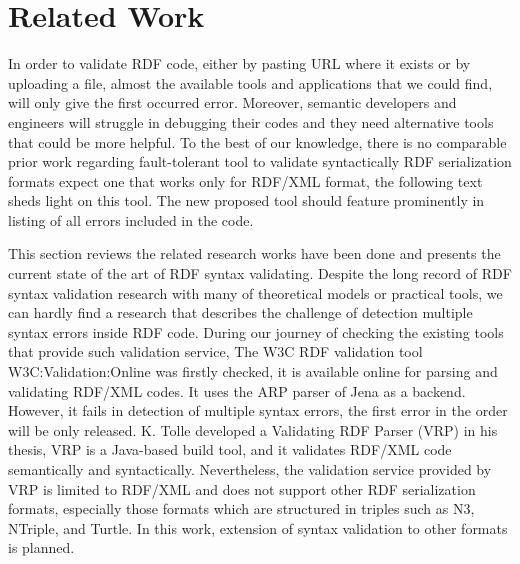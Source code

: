 \chapter{Related Work}
\label{ch:related}
\newpage


In order to validate RDF code, either by pasting URL where it exists or by uploading a file, almost the available tools and applications that we could find, will only give the first occurred error. Moreover, semantic developers and engineers will struggle in debugging their codes and they need alternative tools that could be more helpful. To the best of our knowledge, there is no comparable prior work regarding fault-tolerant tool to validate syntactically RDF serialization formats expect one that works only for RDF/XML format, the following text sheds light on this tool. The new proposed tool should feature prominently in listing of all errors included in the code.
	\vspace{5mm} %
\par This section reviews the related research works have been done and presents the current state of the art of RDF syntax validating. Despite the long record of RDF syntax validation research with many of theoretical models or practical tools, we can hardly find a research that describes the challenge of detection multiple syntax errors inside RDF code. During our journey of checking the existing tools that provide such validation service, The W3C RDF validation tool \cite{bibid}{W3C:Validation:Online} was firstly checked, it is available online for parsing and validating RDF/XML codes. It uses the ARP parser of Jena \cite{McBride:2002:JSW:613357.613755} as a backend. However, it fails in detection of multiple syntax errors, the first error in the order will be only released. K. Tolle developed a Validating RDF Parser (VRP) \cite{karsten:Thesis:2000} in his thesis, VRP is a Java-based build tool, and it validates RDF/XML code semantically and syntactically. Nevertheless, the validation service provided by VRP is limited to RDF/XML and does not support other RDF serialization formats, especially those formats which are structured in triples such as N3, NTriple, and Turtle. In this work, extension of syntax validation to other formats is planned. 
	\vspace{5mm} %
